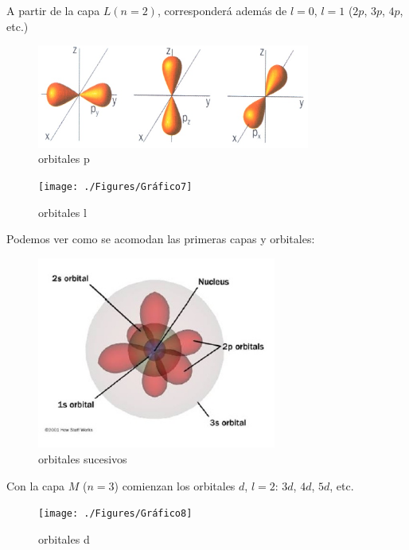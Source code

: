 A partir de la capa $L (n=2)$, corresponderá además de $l=0$, $l= 1$ ($2p$, $3p$, $4p$, etc.)


\begin{figure}[H]
    \centering
    \includegraphics[width=0.8\textwidth]{./Figures/OrbitalesP}
	\caption{orbitales p}
	\label{fig:GraficoOrbitalesP}
\end{figure}

\begin{figure}[H]
    \centering
    \texttt{[image: ./Figures/Gráfico7]}
	\caption{orbitales l}
	\label{fig:Grafico7}
\end{figure}

Podemos ver como se acomodan las primeras capas y orbitales:

\begin{figure}[H]
    \centering
    \includegraphics[width=0.7\textwidth]{./Figures/variosOrbitales}
	\caption{orbitales sucesivos}
	\label{fig:variosOrbitales}
\end{figure}

Con la capa $M$ ($n=3$) comienzan los orbitales $d$, $l=2$: $3d$, $4d$, $5d$, etc.

\begin{figure}[H]
    \centering
    \texttt{[image: ./Figures/Gráfico8]}
	\caption{orbitales d}
	\label{fig:Grafico8}
\end{figure}








